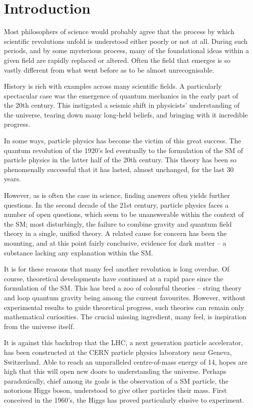 \chapter*{Introduction}

Most philosophers of science would probably agree that the process by which
scientific revolutions unfold is understood either poorly or not at all. During
such periods, and by some mysterious process, many of the foundational ideas
within a given field are rapidly replaced or altered. Often the field that
emerges is so vastly different from what went before as to be almost
unrecognisable.

History is rich with examples across many scientific fields. A particularly
spectacular case was the emergence of quantum mechanics in the early part of the
20th century. This instigated a seismic shift in physicists' understanding of
the universe, tearing down many long-held beliefs, and bringing with it
incredible progress.

In some ways, particle physics has become the victim of this great success. The
quantum revolution of the 1920's led eventually to the formulation of the
\acf{SM} of particle physics in the latter half of the 20th century. This theory
has been so phenomenally successful that it has lasted, almost unchanged, for
the last 30 years.

However, as is often the case in science, finding answers often yields further
questions. In the second decade of the 21st century, particle physics faces a
number of open questions, which seem to be unanswerable within the context of
the \ac{SM}; most disturbingly, the failure to combine gravity and quantum field
theory in a single, unified theory. A related cause for concern has been the
mounting, and at this point fairly conclusive, evidence for dark matter -- a
substance lacking any explanation within the \ac{SM}.

It is for these reasons that many feel another revolution is long overdue. Of
course, theoretical developments have continued at a rapid pace since the
formulation of the \ac{SM}. This has bred a zoo of colourful theories -- string
theory and loop quantum gravity being among the current favourites. However,
without experimental results to guide theoretical progress, such theories can
remain only mathematical curiosities. The crucial missing ingredient, many feel,
is inspiration from the universe itself.

It is against this backdrop that the \ac{LHC}, a next generation particle
accelerator, has been constructed at the \ac{CERN} particle physics laboratory
near Geneva, Switzerland. Able to reach an unparalleled centre-of-mass energy of
\unit{14}{\TeV}, hopes are high that this will open new doors to understanding
the universe. Perhaps paradoxically, chief among its goals is the observation of
a \ac{SM} particle, the notorious Higgs boson, understood to give other
particles their mass. First conceived in the 1960's, the Higgs has proved
particularly elusive to experiment.

